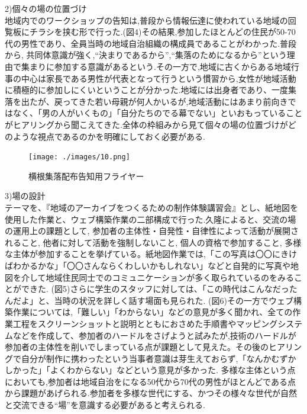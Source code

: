 \documentclass[a4paper]{jsarticle}
\begin{document}
\item 2)個々の場の位置づけ\\
地域内でのワークショップの告知は,普段から情報伝達に使われている地域の回覧板にチラシを挟む形で行った.(図4)その結果,参加したほとんどの住民が50-70代の男性であり、全員当時の地域自治組織の構成員であることがわかった.普段から, 共同体意識が強く,“決まりであるから”,“集落のためになるから”という理由で集まりに参加する意識があるという.その一方で,地域に古くからある地域行事の中心は家長である男性が代表となって行うという慣習から,女性が地域活動に積極的に参加しにくいということが分かった.地域には出身者であり、一度集落を出たが、戻ってきた若い母親が何人かいるが,地域活動にはあまり前向きではなく、「男の人がいくもの」「自分たちのでる幕でない」といおもっていることがヒアリングから聞こえてきた.全体の枠組みから見て個々の場の位置づけがどのような視点であるのかを明確にしておく必要がある.\\
\begin{figure}[H]
  \begin{center}
    \texttt{[image: ./images/10.png]}
    \caption{横根集落配布告知用フライヤー}
    \label{fig:tmu_hino}
  \end{center}
\end{figure}

\item 3)場の設計\\
テーマを、『地域のアーカイブをつくるための制作体験講習会』とし、紙地図を使用した作業と、ウェブ構築作業の二部構成で行った.久隆によると、交流の場の運用上の課題として, 参加者の主体性・自発性・自律性によって活動が展開されること, 他者に対して活動を強制しないこと, 個人の資格で参加すること, 多様な主体が参加することを挙げている。\cite{16}紙地図作業では,「この写真は〇〇にきけばわかるかな」「〇〇さんならくわしいかもしれない」などと自発的に写真や地図を介して地域住民同士でのコミュニケーションが多く取られているのをみることができた. (図5)さらに学生のスタッフに対しては、「この時代はこんなだったんだよ」と、当時の状況を詳しく話す場面も見られた. (図6)その一方でウェブ構築作業については,「難しい」「わからない」などの意見が多く聞かれ、全ての作業工程をスクリーンショットと説明とともにおさめた手順書やマッピングシステムなどを作成して、参加者のハードルをさげようと試みたが,技術のハードルが参加者の主体性を削いでしまっている点が課題として見えた。その後のヒアリングで自分が制作に携わったという当事者意識は芽生えておらず,「なんかむずかしかった」「よくわからない」などという意見が多かった.
多様な主体という点においても,参加者は地域自治をになる50代から70代の男性がほとんどである点から課題があげられる.参加者を多様な世代にする、かつその様々な世代が自然と交流できる“場”を意識する必要があると考えられる.\par
\end{document}
